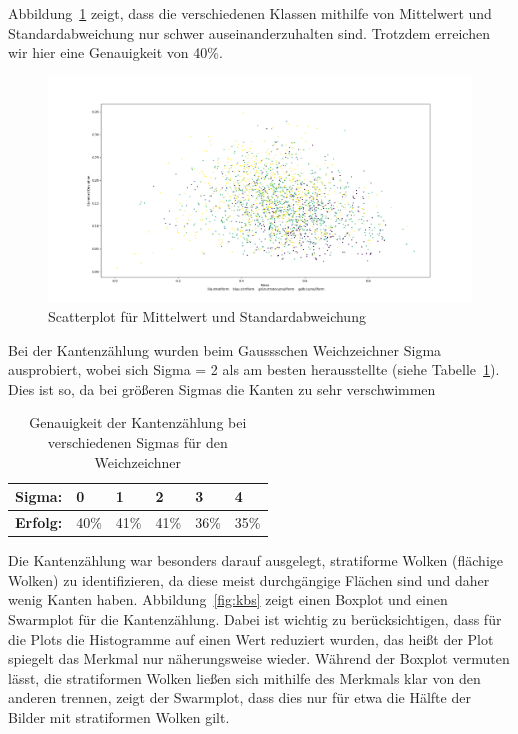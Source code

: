 \documentclass[a4,german]{article}
\begin{document}
Abbildung~\ref{fig:meanstd} zeigt, dass die verschiedenen Klassen mithilfe von Mittelwert und Standardabweichung nur schwer auseinanderzuhalten sind. Trotzdem erreichen wir hier eine Genauigkeit von 40\%.
\begin{figure}[h!]
\centering
\includegraphics[width=1.1\textwidth]{Scatterplot_mean_std.png} %
\caption{Scatterplot für Mittelwert und Standardabweichung}
\label{fig:meanstd}
\end{figure}

Bei der Kantenzählung wurden beim Gaussschen Weichzeichner Sigma ausprobiert, wobei sich Sigma = 2 als am besten herausstellte (siehe Tabelle~\ref{tab:sigma}). Dies ist so, da bei größeren Sigmas die Kanten zu sehr verschwimmen %
\begin{table}[h]
\begin{tabular}{|l|l|l|l|l|l|}
 \hline
 \textbf{Sigma:} & 0 & 1 & 2 & 3 & 4\\
 \hline
 \textbf{Erfolg:} & 40\% & 41\% & 41\% & 36\% & 35\% \\
 \hline
\end{tabular}
\caption{Genauigkeit der Kantenzählung bei verschiedenen Sigmas für den Weichzeichner}
\label{tab:sigma}
\end{table}
Die Kantenzählung war besonders darauf ausgelegt, stratiforme Wolken (flächige Wolken) zu identifizieren, da diese meist durchgängige Flächen sind und daher wenig Kanten haben. Abbildung~\ref{fig:kbs} zeigt einen Boxplot und einen Swarmplot für die Kantenzählung. Dabei ist wichtig zu berücksichtigen, dass für die Plots die Histogramme auf einen Wert reduziert wurden, das heißt der Plot spiegelt das Merkmal nur näherungsweise wieder. Während der Boxplot vermuten lässt, die stratiformen Wolken ließen sich mithilfe des Merkmals klar von den anderen trennen, zeigt der Swarmplot, dass dies nur für etwa die Hälfte der Bilder mit stratiformen Wolken gilt. %
\end{document}
